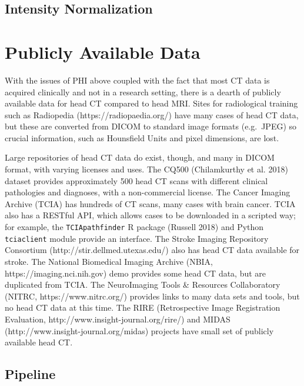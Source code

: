 \documentclass[]{elsarticle} %
\begin{document}
\hypertarget{intensity-normalization}{%
\subsection{Intensity Normalization}\label{intensity-normalization}}

\hypertarget{publicly-available-data}{%
\section{Publicly Available Data}\label{publicly-available-data}}

With the issues of PHI above coupled with the fact that most CT data is
acquired clinically and not in a research setting, there is a dearth of
publicly available data for head CT compared to head MRI. Sites for
radiological training such as Radiopedia (https://radiopaedia.org/) have
many cases of head CT data, but these are converted from DICOM to
standard image formats (e.g.~JPEG) so crucial information, such as
Hounsfield Units and pixel dimensions, are lost.

Large repositories of head CT data do exist, though, and many in DICOM
format, with varying licenses and uses. The CQ500 (Chilamkurthy et al.
2018) dataset provides approximately 500 head CT scans with different
clinical pathologies and diagnoses, with a non-commercial license. The
Cancer Imaging Archive (TCIA) has hundreds of CT scans, many cases with
brain cancer. TCIA also has a RESTful API, which allows cases to be
downloaded in a scripted way; for example, the \texttt{TCIApathfinder} R
package (Russell 2018) and Python \texttt{tciaclient} module provide an
interface. The Stroke Imaging Repository Consortium
(http://stir.dellmed.utexas.edu/) also has head CT data available for
stroke. The National Biomedical Imaging Archive (NBIA,
https://imaging.nci.nih.gov) demo provides some head CT data, but are
duplicated from TCIA. The NeuroImaging Tools \& Resources Collaboratory
(NITRC, https://www.nitrc.org/) provides links to many data sets and
tools, but no head CT data at this time. The RIRE (Retrospective Image
Registration Evaluation, http://www.insight-journal.org/rire/) and MIDAS
(http://www.insight-journal.org/midas) projects have small set of
publicly available head CT.

\hypertarget{pipeline}{%
\subsection{Pipeline}\label{pipeline}}
\end{document}

